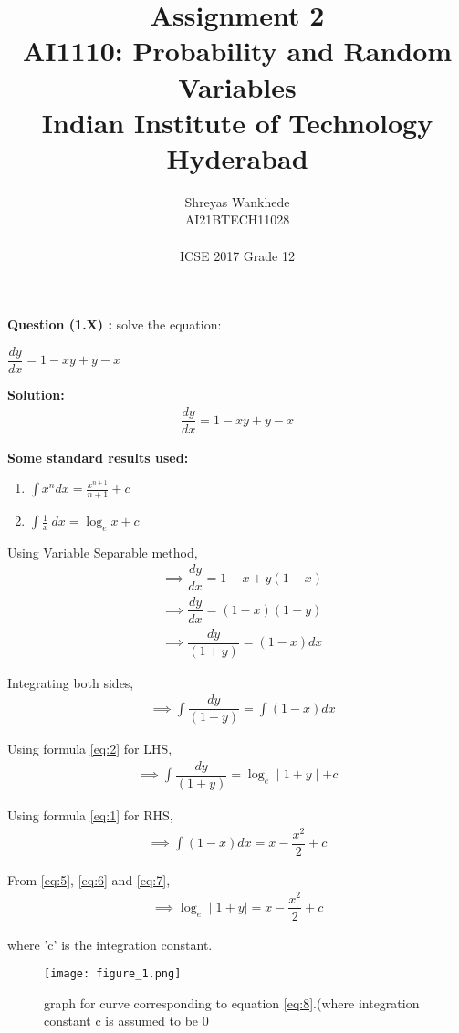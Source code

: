 \documentclass[journal,12pt, two column]{IEEEtran}
\title{Assignment 2\\ \Large AI1110: Probability and Random Variables \\ \large Indian Institute of Technology Hyderabad}
\author{Shreyas Wankhede \\ \normalsize AI21BTECH11028 \\ \vspace*{20pt} \\ \Large ICSE 2017 Grade 12}
\begin{document}
\maketitle

\textbf{Question (1.X) :}
solve the equation:
\begin{center}
$\dfrac{dy}{dx} =1 - xy + y - x$\\
\end{center}

\textbf{Solution:}
\begin{align}
 \dfrac{dy}{dx} =1 - xy + y - x
\end{align}

\textbf{Some standard results used:}
\begin{enumerate}
\item $\int x^n dx = \frac{x^{n+1}}{n+1} + c$ \label{eq:1}
\item $\int \frac{1}{x}\ dx = \log_e x + c$ \label{eq:2}
\end{enumerate}

Using Variable Separable method,
\begin{align}
&\implies\dfrac{dy}{dx} =1 - x + y(1-x)\\
&\implies\dfrac{dy}{dx} =(1-x)(1+y)\\
&\implies\dfrac{dy}{(1+y)} =(1-x)dx
\end{align}

Integrating both sides,
\begin{align}
&\implies\int\dfrac{dy}{(1+y)} =\int(1-x)dx\label{eq:5}
\end{align}

Using formula \eqref{eq:2} for LHS,
\begin{align}
\implies\int\dfrac{dy}{(1+y)}=\log_e\mid1+y\mid+c\label{eq:6}
\end{align}

Using formula \eqref{eq:1} for RHS,
\begin{align}
\implies\int(1-x)dx=x - \dfrac{x^2}{2} + c\label{eq:7}
\end{align}

From \eqref{eq:5}, \eqref{eq:6} and \eqref{eq:7},
\begin{align}
\implies\log_e\mid1+y\mid = x - \dfrac{x^2}{2} + c\label{eq:8}
\end{align}

where 'c' is the integration constant.


\begin{figure}[!ht]
		\centering
		\texttt{[image: figure\_1.png]}
		\caption{graph for curve corresponding to equation \eqref{eq:8}.(where integration constant c is assumed to be 0}
		\label{fig-1}
	\end{figure}
\end{document}

